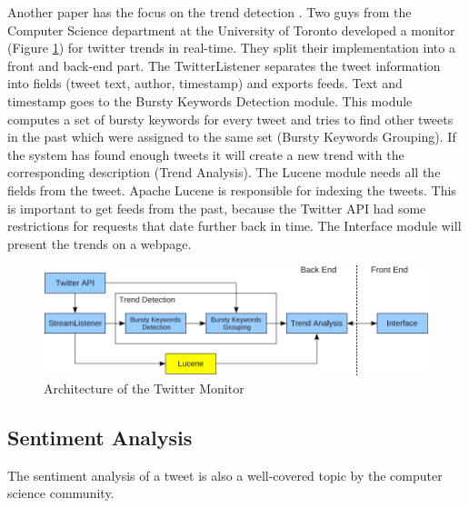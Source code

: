 \documentclass[a4paper]{article}
\begin{document}
Another paper has the focus on the trend detection \cite{Mathioudakis2010}. Two guys from the Computer Science department at the University of Toronto developed a monitor (Figure \ref{monitorArchitecture}) for twitter trends in real-time. They split their implementation into a front and back-end part. The TwitterListener separates the tweet information into fields (tweet text, author, timestamp) and exports feeds. Text and timestamp goes to the Bursty Keywords Detection module. This module computes a set of bursty keywords for every tweet and tries to find other tweets in the past which were assigned to the same set (Bursty Keywords Grouping). If the system has found enough tweets it will create a new trend with the corresponding description (Trend Analysis). The Lucene module needs all the fields from the tweet. Apache Lucene is responsible for indexing the tweets. This is important to get feeds from the past, because the Twitter API had some restrictions for requests that date further back in time. The Interface module will present the trends on a webpage.
\begin{figure}[h!]
	\centering
	\includegraphics[scale=0.45]{images/monitorArchitecture.png}
	\caption{Architecture of the Twitter Monitor}
	\label{monitorArchitecture}
\end{figure}

\subsection{Sentiment Analysis}
The sentiment analysis of a tweet is also a well-covered topic by the computer science community.\\ 
\end{document}
